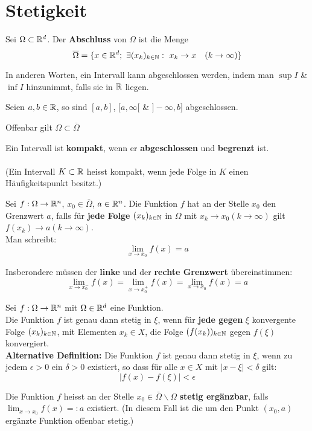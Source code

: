 \chapter{Stetigkeit}

\begin{definition}[Abschluss]
Sei $\Omega \subset \mathbb{R} ^d$.
Der \textbf{Abschluss} von $\Omega$ ist die Menge
$$\overline{\Omega} = \{x \in \mathbb{R}^d; \ \exists(x_k)_{k\in \mathbb{N}}: \ x_k \rightarrow x \quad (k \rightarrow \infty)\}$$

In anderen Worten, ein Intervall kann abgeschlossen werden, indem man $\sup I$ \& $\inf I$ hinzunimmt, falls sie in $\mathbb{R}$ liegen.

Seien $a,b \in \mathbb{R}$, so sind $[a,b]$, $[a,\infty[$ \& $]-\infty,b]$ abgeschlossen.

Offenbar gilt $\Omega \subset \overline{\Omega}$
\end{definition}

\begin{definition}[Kompakt]
	Ein Intervall ist \textbf{kompakt}, wenn er \textbf{abgeschlossen} und \textbf{begrenzt} ist.
    \\\\
    (Ein Intervall $K\subset \mathbb{R}$ heisst kompakt, wenn jede Folge in $K$ einen Häufigkeitspunkt besitzt.)
\end{definition}

\begin{definition}
Sei $f: \Omega \rightarrow \mathbb{R}^n$, $x_0 \in \bar{\Omega}$, $a \in \mathbb{R}^n$.
Die Funktion $f$ hat an der Stelle $x_0$ den Grenzwert $a$, falls für \textbf{jede Folge} $(x_k)_{k \in \mathbb{N}}$ in $\Omega$ mit $x_k \rightarrow x_0 (k \to \infty)$ gilt $f(x_k) \to a (k \rightarrow \infty)$.\\
Man schreibt: $$\lim_{x \to x_0} f(x) = a$$

Insberondere müssen der \textbf{linke} und der \textbf{rechte Grenzwert} übereinstimmen: 
$$\lim_{x \to x_0^-} f(x) = \lim_{x \to x_0^+} f(x) = \lim_{x \to x_0} f(x) = a$$
\end{definition}

\begin{definition}
Sei $f: \Omega \rightarrow \mathbb{R}^n $ mit $\Omega \in \mathbb{R}^d$ eine Funktion. \\
Die Funktion $f$ ist genau dann stetig in $\xi$, wenn für \textbf{jede gegen} $\xi$ konvergente Folge $(x_k)_{k \in \mathbb{N}}$, mit Elementen $x_k \in X$, die Folge $(f(x_k))_{k \in \mathbb{N}}$ gegen $f(\xi)$ konvergiert.\\

\textbf{Alternative Definition:} Die Funktion $f$ ist genau dann stetig in $\xi$, wenn zu jedem $\epsilon > 0$ ein $\delta > 0$ existiert, so dass für alle $x \in X$ mit $|x - \xi| < \delta$ gilt:
$$|f(x) - f(\xi)| < \epsilon$$

Die Funktion $f$ heisst an der Stelle $x_0 \in \bar{\Omega}\backslash \Omega$ \textbf{stetig ergänzbar}, falls $\lim_{x \to x_0} f(x) =: a$ existiert. (In diesem Fall ist die um den Punkt $(x_0,a)$ ergänzte Funktion offenbar stetig.)
\end{definition}

